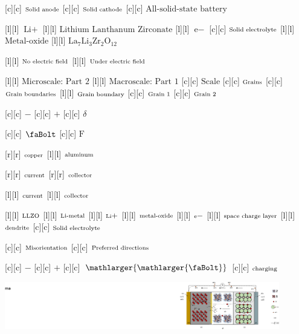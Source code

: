 [c][c] {$\text{\scriptsize Solid anode}$}
[c][c] {$\text{\scriptsize Solid cathode}$}
[c][c] {$\text{All-solid-state battery}$}

[l][l] {$\text{Li}+$}
[l][l] {$\text{Lithium Lanthanum Zirconate}$}
[l][l] {$\text{e}-$}
[c][c] {$\text{\scriptsize Solid electrolyte}$}
[l][l] {$\text{Metal-oxide}$}
[l][l] {$\text{La}_{7}\text{Li}_{3}\text{Zr}_{2}\text{O}_{12}$}

[l][l] {$\text{\scriptsize  No electric field}$}
[l][l] {$\text{\scriptsize  Under electric field}$}

[l][l] {$\text{Microscale: Part 2}$}
[l][l] {$\text{Macroscale: Part 1}$}
[c][c] {$\text{Scale}$}
[c][c] {$\text{\scriptsize Grains}$}
[c][c] {$\text{\scriptsize Grain boundaries}$}
[l][l] {$\text{\scriptsize Grain boundary}$}
[c][c] {$\text{\scriptsize Grain 1}$}
[c][c] {$\text{\scriptsize Grain 2}$}

[c][c] {$-$}
[c][c] {$+$}
[c][c] {$\delta$}

[c][c] {$\text{\faBolt}$}
[c][c] {$\text{F}$}

[r][r] {$\scriptsize  \text{copper}$}
[l][l] {$\scriptsize  \text{aluminum}$}

[r][r] {$\scriptsize  \text{current}$}
[r][r] {$\scriptsize  \text{collector}$}

[l][l] {$\scriptsize  \text{current}$}
[l][l] {$\scriptsize  \text{collector}$}

[l][l] {$\scriptsize \text{LLZO}$}
[l][l] {$\scriptsize \text{Li-metal}$}
[l][l] {$\scriptsize \text{Li}+$}
[l][l] {$\scriptsize \text{metal-oxide}$}
[l][l] {$\scriptsize \text{e}-$}
[l][l] {$\scriptsize \text{space charge layer}$}
[l][l] {$\scriptsize \text{dendrite}$}
[c][c] {$\scriptsize  \text{Solid electrolyte}$}

[c][c] {$\scriptsize \text{Misorientation}$}
[c][c] {$\scriptsize \text{Preferred directions}$}

[c][c] {$-$}
[c][c] {$+$}
[c][c] {$\mathlarger{\mathlarger{\text{\faBolt}}}$}
[c][c] {$\scriptsize  \text{charging}$}

\includegraphics[width=0.9\textwidth]{dendrite_pdirection_battonly_maths.eps}